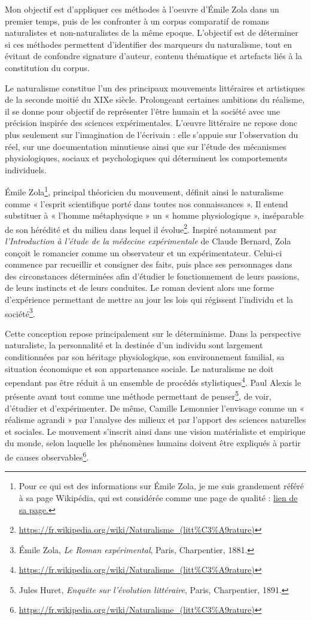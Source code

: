 Mon objectif est d'appliquer ces méthodes à l'oeuvre d'Émile Zola dans un premier temps, puis de les confronter à un corpus comparatif de romans naturalistes et non-naturalistes de la même epoque. L'objectif est de déterminer si ces méthodes permettent d'identifier des marqueurs du naturalisme, tout en évitant de confondre signature d’auteur, contenu thématique et artefacts liés à la constitution du corpus.

Le naturalisme constitue l’un des principaux mouvements littéraires et artistiques de la seconde moitié du XIXe siècle. Prolongeant certaines ambitions du réalisme, il se donne pour objectif de représenter l’être humain et la société avec une précision inspirée des sciences expérimentales. L’œuvre littéraire ne repose donc plus seulement sur l’imagination de l’écrivain : elle s’appuie sur l’observation du réel, sur une documentation minutieuse ainsi que sur l’étude des mécanismes physiologiques, sociaux et psychologiques qui déterminent les comportements individuels.

Émile Zola\footnote{Pour ce qui est des informations sur Émile Zola, je me suis grandement référé à sa page Wikipédia, qui est considérée comme une page de qualité : \href{{https://fr.wikipedia.org/wiki/\%C3\%89mile_Zola}}{lien de sa page.}}, principal théoricien du mouvement, définit ainsi le naturalisme comme « l’esprit scientifique porté dans toutes nos connaissances ». Il entend substituer à « l’homme métaphysique » un « homme physiologique », inséparable de son hérédité et du milieu dans lequel il évolue\footnote{\url{https://fr.wikipedia.org/wiki/Naturalisme_(litt\%C3\%A9rature)}}. Inspiré notamment par \textit{l’Introduction à l’étude de la médecine expérimentale} de Claude Bernard, Zola conçoit le romancier comme un observateur et un expérimentateur. Celui-ci commence par recueillir et consigner des faits, puis place ses personnages dans des circonstances déterminées afin d’étudier le fonctionnement de leurs passions, de leurs instincts et de leurs conduites. Le roman devient alors une forme d’expérience permettant de mettre au jour les lois qui régissent l’individu et la société\footnote{Émile Zola, \textit{Le Roman expérimental}, Paris, Charpentier, 1881.}.

Cette conception repose principalement sur le déterminisme. Dans la perspective naturaliste, la personnalité et la destinée d’un individu sont largement conditionnées par son héritage physiologique, son environnement familial, sa situation économique et son appartenance sociale. Le naturalisme ne doit cependant pas être réduit à un ensemble de procédés stylistiques\footnote{\url{https://fr.wikipedia.org/wiki/Naturalisme_(litt\%C3\%A9rature)}}. Paul Alexis le présente avant tout comme une méthode permettant de penser\footnote{Jules Huret, \textit{Enquête sur l'évolution littéraire}, Paris, Charpentier, 1891.}, de voir, d’étudier et d’expérimenter. De même, Camille Lemonnier l’envisage comme un « réalisme agrandi » par l’analyse des milieux et par l’apport des sciences naturelles et sociales. Le mouvement s’inscrit ainsi dans une vision matérialiste et empirique du monde, selon laquelle les phénomènes humains doivent être expliqués à partir de causes observables\footnote{\url{https://fr.wikipedia.org/wiki/Naturalisme_(litt\%C3\%A9rature)}}.

